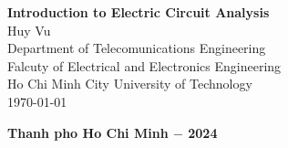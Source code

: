 \documentclass[12pt, a4paper]{article}
\begin{document}
\begin{titlepage}
    \centering
    \vspace*{1in}

    {\LARGE \bfseries Introduction to Electric Circuit Analysis}\\[1.5cm]

    {\large Huy Vu}\\[0.5cm]
    {\large Department of Telecomunications Engineering}\\
    {\large Falcuty of Electrical and Electronics Engineering}\\
    {\large Ho Chi Minh City University of Technology}\\[2cm]

    {\large \today}

    \vfill
    \textbf{Thanh pho Ho Chi Minh $-$ 2024}
\end{titlepage}
{
  \tableofcontents
}
\newpage

\newpage

\newpage

\end{document}

